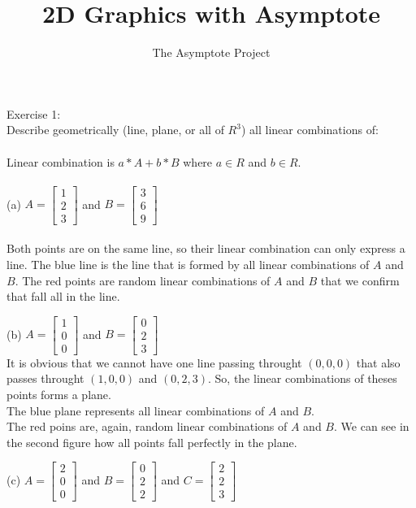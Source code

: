 \documentclass[12pt]{article}
\title{2D Graphics with Asymptote}
\author{The Asymptote Project}
\newcommand{\insertrep}[1]{%
	\hspace*{-2.4cm}
	\fbox{\texttt{[image: \#1]}}

}
\begin{document}
Exercise 1:\\
Describe geometrically (line, plane, or all of $R^3$) all linear combinations of:\\\\
Linear combination is $a*A+b*B$ where $a \in R$ and $b \in R$.\\
\\
(a) $A = \begin{bmatrix}1\\2\\3\end{bmatrix}$ and $B = \begin{bmatrix}3\\6\\9\end{bmatrix}$\\
\\
Both points are on the same line, so their linear combination can only express a line. The blue line is the line that is formed by all linear combinations of $A$ and $B$. The red points are random linear combinations of $A$ and $B$ that we confirm that fall all in the line.\\
\begin{center}
\insertrep{exercise01001a.pdf}
\end{center}
\newpage
(b)  $A = \begin{bmatrix}1\\0\\0\end{bmatrix}$ and $B = \begin{bmatrix}0\\2\\3\end{bmatrix}$\\
It is obvious that we cannot have one line passing throught $(0,0,0)$ that also passes throught $(1,0,0)$ and $(0,2,3)$. So, the linear combinations of theses points forms a plane.\\
The blue plane represents all linear combinations of $A$ and $B$.\\
The red poins are, again, random linear combinations of $A$ and $B$. We can see in the second figure how all points fall perfectly in the plane.
\begin{center}
\insertrep{exercise01001b1.pdf}
\end{center}
\begin{center}
	\insertrep{exercise01001b2.pdf}
\end{center}
\newpage
(c) $A = \begin{bmatrix}2\\0\\0\end{bmatrix}$ and $B = \begin{bmatrix}0\\2\\2\end{bmatrix}$ and $C = \begin{bmatrix}2\\2\\3\end{bmatrix}$\\
\end{document}
